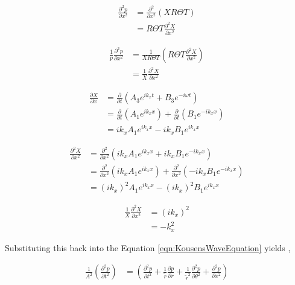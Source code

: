 \begin{align*}
    \frac{\partial^2 p}{\partial x^2} 
    &=
    \frac{\partial^2 }{\partial x^2}  \left( XR\Theta T \right) \\
    &=
    R\Theta T \frac{\partial^2 X}{\partial x^2}  
\end{align*}


\begin{align*}
    \frac{1}{p}\frac{\partial^2 p}{\partial x^2} 
    &=
    \frac{ 1}{X R \Theta T}  \left( R\Theta T \frac{\partial^2 X}{\partial x^2} \right) \\
    &=\frac{ 1}{ X}\frac{\partial^2 X}{\partial x^2}  
\end{align*}

\begin{align*}
    \frac{\partial X}{\partial x} &=
    \frac{\partial}{\partial t}
        \left( 
        A_3 e^{i k_x t} + B_3 e^{-i \omega t}
    \right)  \\
    &=
    \frac{\partial}{\partial t} \left(A_1 e^{i k_x x}  \right) +
    \frac{\partial}{\partial t} \left(B_1 e^{-i k_x x }  \right)\\ 
    &= i k_x A_1 e^{i k_x x } - i k_x B_1 e^{i k_x x} 
\end{align*}

\begin{align*}
    \frac{\partial^2 X}{\partial x^2} &=
    \frac{\partial^2}{\partial x^2}
        \left( 
        i k_x A_1 e^{i k_x x} + i k_x B_1 e^{-i k_x x}
    \right)  \\
    &=
    \frac{\partial^2}{\partial x^2} \left(i k_x A_1 e^{i k_x x}  \right) +
    \frac{\partial^2}{\partial x^2} \left(- i k_x B_1 e^{-i k_x x}  \right)\\ 
    &= (i k_x)^2 A_1 e^{i k_x x} - (i k_x)^2 B_1 e^{i k_x x} 
\end{align*}

\begin{align*}
    \frac{1}{X}\frac{\partial^2 X}{\partial x^2} 
    &=
    (i k_x)^2 \\
    &= -k_x^2
\end{align*}

Substituting this back into the Equation \ref{eqn:KousensWaveEquation} yields ,



\begin{align*} 
    \frac{1}{A^2}\left(
        \frac{\partial^2 {p}}{\partial t^2}
    \right) &= 
        \left(
            \frac{\partial^2 {p}}{\partial t^2} + 
            \frac{1}{\tilde{r}}\frac{\partial p}{\partial r} +
            \frac{1}{\tilde{r}^2} \frac{\partial^2 p}{\partial \theta^2} + 
            \frac{\partial^2 p}{\partial x^2} 
        \right) 
\end{align*} 


